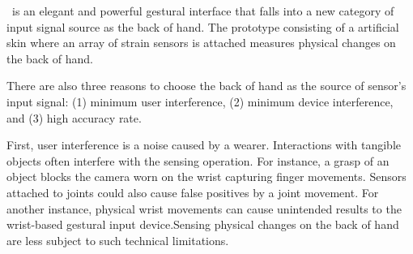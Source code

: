 \documentclass{sigchi}
\begin{document}







 
 

\getTitleName\ is an elegant and powerful gestural interface that falls into a new category of input signal source as the back of hand. The prototype consisting of a artificial skin where an array of strain sensors is attached measures physical changes on the back of hand.


There are also three reasons to choose the back of hand as the source of sensor's input signal: (1) minimum user interference, (2) minimum device interference, and (3) high accuracy rate. 

First, user interference is a noise caused by a wearer. Interactions with tangible objects often interfere with the sensing operation.
For instance, a grasp of an object blocks the camera worn on the wrist capturing finger movements.
Sensors attached to joints could also cause false positives by a joint movement.
For another instance, physical wrist movements can cause unintended results to the wrist-based gestural input device.Sensing physical changes on the back of hand are less subject to such technical limitations. 
\end{document}
